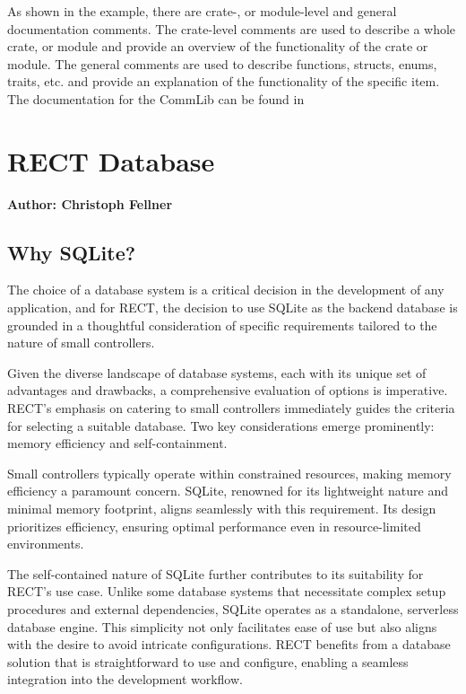 As shown in the example, there are crate-, or module-level and general documentation comments. 
The crate-level comments are used to describe a whole crate, or module and provide an overview of the functionality of the crate or module.
The general comments are used to describe functions, structs, enums, traits, etc. and provide 
an explanation of the functionality of the specific item. The documentation for the CommLib can be found in %

\section{RECT Database}
\textbf{Author: Christoph Fellner}

\subsection{Why SQLite?}
The choice of a database system is a critical decision in the development of any application, and for RECT, the decision to use SQLite as the backend database 
is grounded in a thoughtful consideration of specific requirements tailored to the nature of small controllers.\newline

Given the diverse landscape of database systems, each with its unique set of advantages and drawbacks, a comprehensive evaluation of options is imperative. 
RECT's emphasis on catering to small controllers immediately guides the criteria for selecting a suitable database. Two key considerations emerge prominently: 
memory efficiency and self-containment.\newline

Small controllers typically operate within constrained resources, making memory efficiency a paramount concern. SQLite, renowned for its lightweight nature and 
minimal memory footprint, aligns seamlessly with this requirement. Its design prioritizes efficiency, ensuring optimal performance even in resource-limited 
environments.\newline

The self-contained nature of SQLite further contributes to its suitability for RECT's use case. Unlike some database systems that necessitate complex setup 
procedures and external dependencies, SQLite operates as a standalone, serverless database engine. This simplicity not only facilitates ease of use but also 
aligns with the desire to avoid intricate configurations. RECT benefits from a database solution that is straightforward to use and configure, enabling a 
seamless integration into the development workflow.\newline

